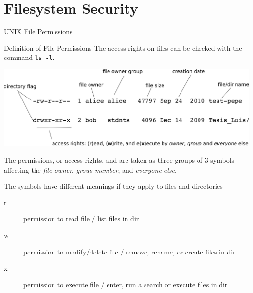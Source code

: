\section{Filesystem Security}
\begin{frame}{UNIX File Permissions}

  \vspace{-0.3cm}
  \begin{block}{Definition of File Permissions}
    {\footnotesize
    The access rights on files can be checked with the command
\alert{\texttt{ls -l}}.}

  \begin{center}
    \includegraphics[angle=0,width=0.75\linewidth]{./Figs/permissions.png}

  \end{center}
{\scriptsize The permissions, or access rights, and are taken as
  three groups of 3 symbols, affecting the \alert{\emph{file owner}}, \alert{\emph{group member}},
  and \alert{\emph{everyone else}}. 

 The symbols have different meanings if they apply
  to files and directories

\begin{description}
\item[r] permission to read file / list files in dir 
\item[w] permission to modify/delete file / remove, rename, or create files in dir 
\item[x] permission to execute file / enter, run a search or execute files in dir 
\end{description}
}

  \end{block}
  
\end{frame}
